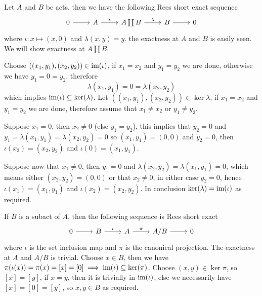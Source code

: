 \begin{example}
    Let $A$ and $B$ be acts, then we have the following Rees short exact sequence
    \[\begin{tikzcd}
        0 & A & {A\coprod B} & B & 0
        \arrow[from=1-1, to=1-2]
        \arrow["\iota", from=1-2, to=1-3]
        \arrow["\lambda", from=1-3, to=1-4]
        \arrow[from=1-4, to=1-5]
    \end{tikzcd}\]
    where $\iota: x \mapsto (x,0)$ and $\lambda(x,y) = y$.
    the exactness at $A$ and $B$ is easily seen. We will show exactness 
    at $A\coprod B$.\par
    Choose $((x_1,y_1),(x_2,y_2))\in\text{im}(\iota)$, if $x_1=x_2$ and $y_1=y_2$ we are done, 
    otherwise we have $y_1=0=y_2$, therefore 
    \[
        \lambda(x_1,y_1)=0=\lambda(x_2,y_2)
    \]
    which implies $\text{im}(\iota)\subseteq\mathrm{ker}(\lambda)$.
    Let $((x_1,y_1),(x_2,y_2))\in\ker{\lambda}$, if $x_1=x_2$ and $y_1=y_2$
    we are done, therefore assume that $x_1\neq x_2$ or $y_1\neq y_2$.\par
    Suppose $x_1=0$, then $x_2\neq 0$ (else $y_1=y_2$), this implies
    that $y_2=0$ and $y_1=\lambda(x_1,y_1)=\lambda(x_2,y_2)=0$
    so $(x_1,y_1)=(0,0)$ and $y_2=0$, then 
    $\iota(x_2)=(x_2,y_2)$ and $\iota(0)=(x_1,y_1)$.\par
    Suppose now that $x_1\neq 0$, then $y_1=0$ and 
    $\lambda(x_2,y_2)=\lambda(x_1,y_1)=0$, which means either 
    $(x_2,y_2)=(0,0)$ or that $x_2\neq 0$, in either case $y_2=0$,
    hence $\iota(x_1)=(x_1,y_1)$ and $\iota(x_2)=(x_2,y_2)$.
    In conclusion $\mathrm{ker}(\lambda)=\text{im}(\iota)$ as required.
\end{example}
\begin{example}
    If $B$ is a subact of $A$, then the following sequence is Rees short exact 
    \[\begin{tikzcd}
        0 & B & A & {A/B} & 0
        \arrow[from=1-1, to=1-2]
        \arrow["\iota", from=1-2, to=1-3]
        \arrow["\pi", from=1-3, to=1-4]
        \arrow[from=1-4, to=1-5]
    \end{tikzcd}\]
    where $\iota$ is the set inclusion map and $\pi$ is the canonical projection. 
    The exactness at $A$ and $A/B$ is trivial. Choose $x\in B$, then we have 
    $\pi(\iota(x)) = \pi(x) = [x] = [0] \implies \text{im}(\iota)\subseteq\mathrm{ker}(\pi)$. Choose 
    $(x,y)\in\ker{\pi}$, so $[x]=[y]$, if $x=y$, then it is trivially in $\text{im}(\iota)$, else 
    we necessarily have $[x]=[0]=[y]$, so $x,y\in B$ as required.
\end{example}
